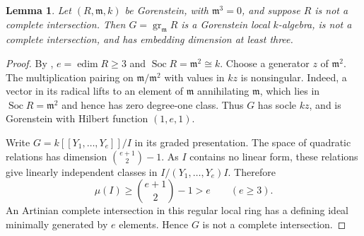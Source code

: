 \documentclass[11pt]{article}
\newtheorem{lemma}[theorem]{Lemma}
\theoremstyle{remark}\newtheorem{remark}[theorem]{Remark}
\newcommand{\m}{\mathfrak m}
\newcommand{\gr}{\operatorname{gr}}
\newcommand{\edim}{\operatorname{edim}}
\newcommand{\Soc}{\operatorname{Soc}}
\begin{document}
\begin{lemma}\label{lem:gorenstein}
Let $(R,\m,k)$ be Gorenstein, with $\m^3=0$, and suppose $R$ is not a complete intersection. Then $G=\gr_{\m}R$ is a Gorenstein local $k$-algebra, is not a complete intersection, and has embedding dimension at least three.
\end{lemma}
\begin{proof}
By \cite[Lemma 7.2(1)]{KT}, $e=\edim R\ge3$ and $\Soc R=\m^2\cong k$. Choose a generator $z$ of $\m^2$. The multiplication pairing on $\m/\m^2$ with values in $kz$ is nonsingular. Indeed, a vector in its radical lifts to an element of $\m$ annihilating $\m$, which lies in $\Soc R=\m^2$ and hence has zero degree-one class. Thus $G$ has socle $kz$, and is Gorenstein with Hilbert function $(1,e,1)$.

Write $G=k[[Y_1,\ldots,Y_e]]/I$ in its graded presentation. The space of quadratic relations has dimension $\binom{e+1}{2}-1$. As $I$ contains no linear form, these relations give linearly independent classes in $I/(Y_1,\ldots,Y_e)I$. Therefore
\[
 \mu(I)\ge\binom{e+1}{2}-1>e\qquad(e\ge3).
\]
An Artinian complete intersection in this regular local ring has a defining ideal minimally generated by $e$ elements. Hence $G$ is not a complete intersection.
\end{proof}
\end{document}
